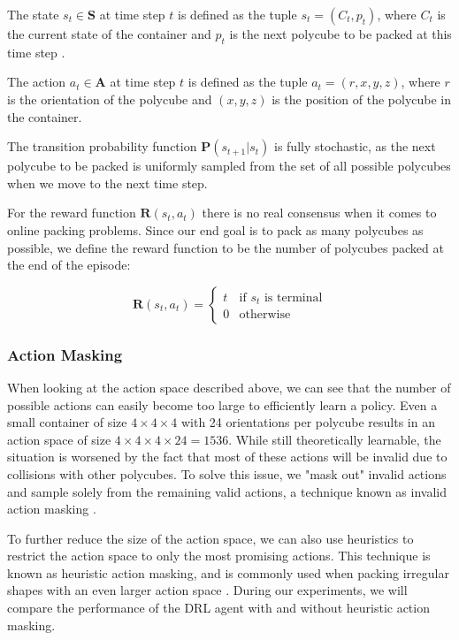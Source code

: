 \documentclass[conference]{IEEEtran}
\begin{document}
The state $s_t \in \mathbf{S}$ at time step $t$ is defined as the tuple $s_t = (C_t, p_t)$, where $C_t$ is the current state of the container and $p_t$ is the next polycube to be packed at this time step \cite{Zhao2022pct}.

The action $a_t \in \mathbf{A}$ at time step $t$ is defined as the tuple $a_t = (r, x, y, z)$, where $r$ is the orientation of the polycube and $(x, y, z)$ is the position of the polycube in the container.

The transition probability function $\mathbf{P}(s_{t + 1} | s_t)$ is fully stochastic, as the next polycube to be packed is uniformly sampled from the set of all possible polycubes when we move to the next time step.

For the reward function $\mathbf{R}(s_t, a_t)$ there is no real consensus when it comes to online packing problems.
Since our end goal is to pack as many polycubes as possible, we define the reward function to be the number of polycubes packed at the end of the episode:

\begin{equation}
    \mathbf{R}(s_t, a_t) =
    \begin{cases}
        t & \text{if } s_t \text{ is terminal} \\
        0 & \text{otherwise}
    \end{cases}
    \label{eq:reward_function}
\end{equation}

\subsubsection{Action Masking}
When looking at the action space described above, we can see that the number of possible actions can easily become too large to efficiently learn a policy.
Even a small container of size $4 \times 4 \times 4$ with 24 orientations per polycube results in an action space of size $4 \times 4 \times 4 \times 24 = 1536$.
While still theoretically learnable, the situation is worsened by the fact that most of these actions will be invalid due to collisions with other polycubes.
To solve this issue, we "mask out" invalid actions and sample solely from the remaining valid actions, a technique known as invalid action masking \cite{Huang2020}.

To further reduce the size of the action space, we can also use heuristics to restrict the action space to only the most promising actions. This technique is known as heuristic action masking, and is commonly used when packing irregular shapes with an even larger action space \cite{Zhao2022general}.
During our experiments, we will compare the performance of the DRL agent with and without heuristic action masking.
\end{document}
